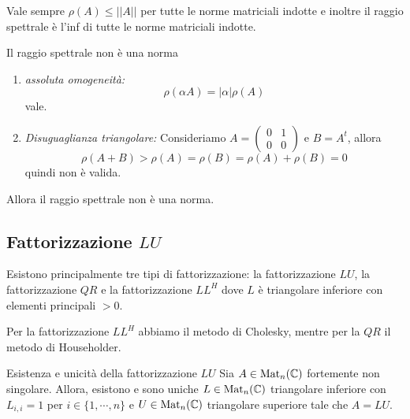\documentclass[a4paper]{article}
\begin{document}
Vale sempre \(\rho(A) \leq ||A||\)
per tutte le norme matriciali indotte
e inoltre il raggio spettrale è l'inf di tutte le norme matriciali indotte.

\begin{snippetproposition}{Il raggio spettrale non è una norma}
    \begin{enumerate}
        \item \emph{assoluta omogeneità:}
            \[
                \rho(\alpha A) = |\alpha| \rho(A)
            \]
            vale.
        \item \emph{Disuguaglianza triangolare:} Consideriamo \(A=\begin{pmatrix}0&1\\0&0\end{pmatrix}\) e \(B=A^t\), allora
            \[
                \rho(A+B) > \rho(A) = \rho(B) = \rho(A) + \rho(B) = 0
            \]
            quindi non è valida.
    \end{enumerate}
    Allora il raggio spettrale non è una norma.
\end{snippetproposition}

\subsection{Fattorizzazione \(LU\)}

Esistono principalmente tre tipi di fattorizzazione:
la fattorizzazione \(LU\), la fattorizzazione \(QR\) e la fattorizzazione \(LL^H\) dove
\(L\) è triangolare inferiore con elementi principali \(>0\).

Per la fattorizzazione \(LL^H\) abbiamo il metodo di Cholesky,
mentre per la \(QR\) il metodo di Householder.

\begin{snippettheorem}{Esistenza e unicità della fattorizzazione \(LU\)}
    Sia \(A \in \operatorname{Mat}_n(\mathbb{C})\) fortemente non singolare.
    Allora, esistono e sono uniche \(L \in \operatorname{Mat}_n(\mathbb{C})\) triangolare
    inferiore con \(L_{i,i} =1\) per \(i \in \{1, \cdots, n\}\) e \(U \in \operatorname{Mat}_n(\mathbb{C})\) triangolare superiore
    tale che \(A = LU\).
\end{snippettheorem}
\end{document}
